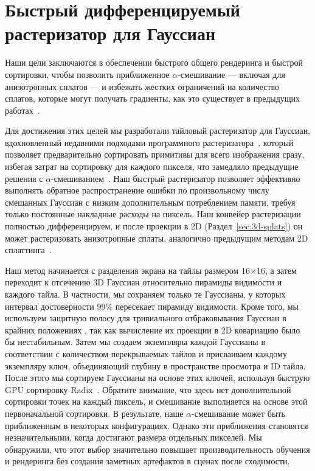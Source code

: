 \section{Быстрый дифференцируемый растеризатор для Гауссиан}
\label{sec:tile-raster}

Наши цели заключаются в обеспечении быстрого общего рендеринга и быстрой сортировки, чтобы позволить приближенное $\alpha$-смешивание — включая для анизотропных сплатов — и избежать жестких ограничений на количество сплатов, которые могут получать градиенты, как это существует в предыдущих работах~\cite{Lassner_2021_CVPR}.

Для достижения этих целей мы разработали тайловый растеризатор для Гауссиан, вдохновленный недавними подходами программного растеризатора~\cite{Lassner_2021_CVPR}, который позволяет предварительно сортировать примитивы для всего изображения сразу, избегая затрат на сортировку для каждого пикселя, что замедляло предыдущие решения с $\alpha$-смешиванием~\cite{kopanas21,kopanas22}. Наш быстрый растеризатор позволяет эффективно выполнять обратное распространение ошибки по произвольному числу смешанных Гауссиан с низким дополнительным потреблением памяти, требуя только постоянные накладные расходы на пиксель.
Наш конвейер растеризации полностью дифференцируем, и после проекции в 2D (Раздел~\ref{sec:3d-splats}) он может растеризовать анизотропные сплаты, аналогично предыдущим методам 2D сплаттинга~\cite{kopanas21}.

Наш метод начинается с разделения экрана на тайлы размером 16$\times$16, а затем переходит к отсечению 3D Гауссиан относительно пирамиды видимости и каждого тайла.
В частности, мы сохраняем только те Гауссианы, у которых интервал достоверности 99\% пересекает пирамиду видимости.
Кроме того, мы используем защитную полосу для тривиального отбраковывания Гауссиан в крайних положениях , так как вычисление их проекции в 2D ковариацию было бы нестабильным.
Затем мы создаем экземпляры каждой Гауссианы в соответствии с количеством перекрываемых тайлов и присваиваем каждому экземпляру ключ, объединяющий глубину в пространстве просмотра и ID тайла. После этого мы сортируем Гауссианы на основе этих ключей, используя быструю GPU сортировку Radix~\cite{merrill2010revisiting}.
Обратите внимание, что здесь нет дополнительной сортировки точек на каждый пиксель, и смешивание выполняется на основе этой первоначальной сортировки. В результате, наше $\alpha$-смешивание может быть приближенным в некоторых конфигурациях.
Однако эти приближения становятся незначительными, когда  достигают размера отдельных пикселей.
Мы обнаружили, что этот выбор значительно повышает производительность обучения и рендеринга без создания заметных артефактов в сценах после сходимости.

